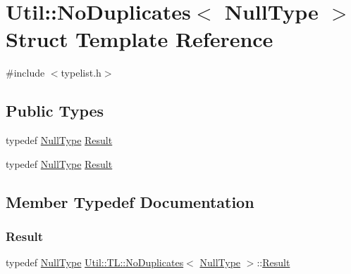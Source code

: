 \hypertarget{structUtil_1_1TL_1_1NoDuplicates_3_01NullType_01_4}{}\section{Util\+:\+:No\+Duplicates$<$ Null\+Type $>$ Struct Template Reference}
\label{structUtil_1_1TL_1_1NoDuplicates_3_01NullType_01_4}


{\ttfamily \#include $<$typelist.\+h$>$}

\subsection*{Public Types}
\begin{DoxyCompactItemize}
\item 
typedef \mbox{\hyperlink{classUtil_1_1NullType}{Null\+Type}} \mbox{\hyperlink{structUtil_1_1TL_1_1NoDuplicates_3_01NullType_01_4_abb8d5323219cad8bdeef505d43773254}{Result}}
\item 
typedef \mbox{\hyperlink{classUtil_1_1NullType}{Null\+Type}} \mbox{\hyperlink{structUtil_1_1TL_1_1NoDuplicates_3_01NullType_01_4_abb8d5323219cad8bdeef505d43773254}{Result}}
\end{DoxyCompactItemize}


\subsection{Member Typedef Documentation}
\mbox{\label{structUtil_1_1TL_1_1NoDuplicates_3_01NullType_01_4_abb8d5323219cad8bdeef505d43773254}} 
\subsubsection{\texorpdfstring{Result}{Result}\hspace{0.1cm}{\footnotesize\ttfamily [1/2]}}
{\footnotesize\ttfamily typedef \mbox{\hyperlink{classUtil_1_1NullType}{Null\+Type}} \mbox{\hyperlink{structUtil_1_1TL_1_1NoDuplicates}{Util\+::\+T\+L\+::\+No\+Duplicates}}$<$ \mbox{\hyperlink{classUtil_1_1NullType}{Null\+Type}} $>$\+::\mbox{\hyperlink{structUtil_1_1TL_1_1NoDuplicates_3_01NullType_01_4_abb8d5323219cad8bdeef505d43773254}{Result}}}

